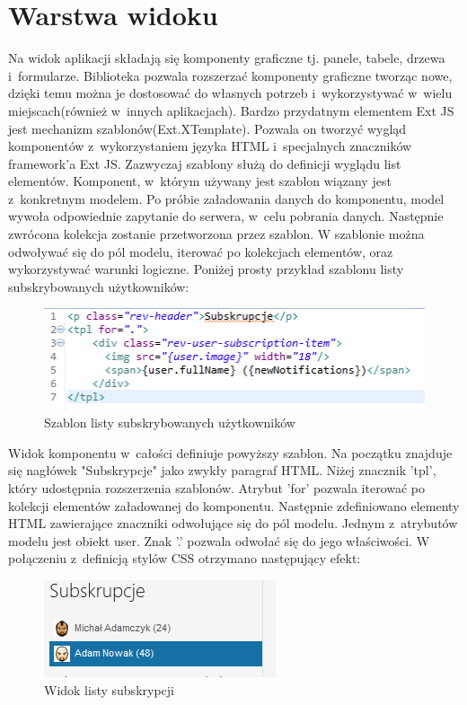 \section{Warstwa widoku}

Na widok aplikacji składają się komponenty graficzne tj. panele, tabele, drzewa i~formularze. Biblioteka pozwala rozszerzać komponenty graficzne tworząc nowe, dzięki temu można je dostosować do własnych potrzeb i~wykorzystywać w~wielu miejscach(również w~innych aplikacjach). Bardzo przydatnym elementem Ext JS jest mechanizm szablonów(Ext.XTemplate). Pozwala on tworzyć wygląd komponentów z~wykorzystaniem języka HTML i~specjalnych znaczników framework'a Ext JS. Zazwyczaj szablony służą do definicji wyglądu list elementów. Komponent, w~którym używany jest szablon wiązany jest z~konkretnym modelem. Po próbie załadowania danych do komponentu, model wywoła odpowiednie zapytanie do serwera, w~celu pobrania danych. Następnie zwrócona kolekcja zostanie przetworzona przez szablon. W szablonie można odwoływać się do pól modelu, iterować po kolekcjach elementów, oraz wykorzystywać warunki logiczne. Poniżej prosty przykład szablonu listy subskrybowanych użytkowników:
 
\begin{figure}[H]
	\centering
	\includegraphics[width=\textwidth]{images/tpl.png}
	\caption{Szablon listy subskrybowanych użytkowników}
\end{figure}

Widok komponentu w~całości definiuje powyższy szablon. Na początku znajduje się nagłówek "Subskrypcje" jako zwykły paragraf HTML. Niżej znacznik 'tpl', który udostępnia rozszerzenia szablonów. Atrybut 'for' pozwala iterować po kolekcji elementów załadowanej do komponentu. Następnie zdefiniowano elementy HTML zawierające znaczniki odwołujące się do pól modelu. Jednym z~atrybutów modelu jest obiekt user. Znak '.' pozwala odwołać się do jego właściwości. W połączeniu z~definicją stylów CSS otrzymano następujący efekt:
 
\begin{figure}[H]
	\centering
	\includegraphics[width=\textwidth]{images/subs.png}
	\caption{Widok listy subskrypcji}
\end{figure}

